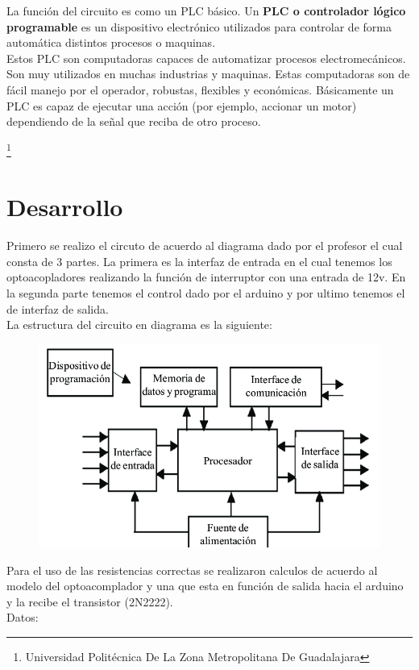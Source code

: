 \documentclass[10pt,a4paper]{article}
\begin{document}
La función del circuito es como un PLC básico. Un \textbf{PLC o controlador lógico programable} es un dispositivo electrónico utilizados para controlar de forma automática distintos procesos o maquinas.\\
Estos PLC son computadoras capaces de automatizar procesos electromecánicos. Son muy utilizados en muchas industrias y maquinas. Estas computadoras son de fácil manejo por el operador, robustas, flexibles y económicas. Básicamente un PLC es capaz de ejecutar una acción (por ejemplo, accionar un motor) dependiendo de la señal que reciba de otro proceso.


\footnote{Universidad Politécnica De La Zona Metropolitana De Guadalajara} 
\newpage

\section{Desarrollo}

Primero se realizo el circuto de acuerdo al diagrama dado por el profesor el cual consta de 3 partes. La primera es la interfaz de entrada en el cual tenemos los optoacopladores realizando la función de interruptor con una entrada de 12v. En la segunda parte tenemos el control dado por el arduino y por ultimo tenemos el de interfaz de salida.\\

La estructura del circuito en diagrama es la siguiente:\\

\begin{figure}[hbtp]
\centering
\includegraphics[scale=0.60]{estructura.png} 
\end{figure}

Para el uso de las resistencias correctas se realizaron calculos de acuerdo al modelo del optoacomplador y una que esta en función de salida hacia el arduino y la recibe el transistor (2N2222).\\
Datos:\\
\end{document}
